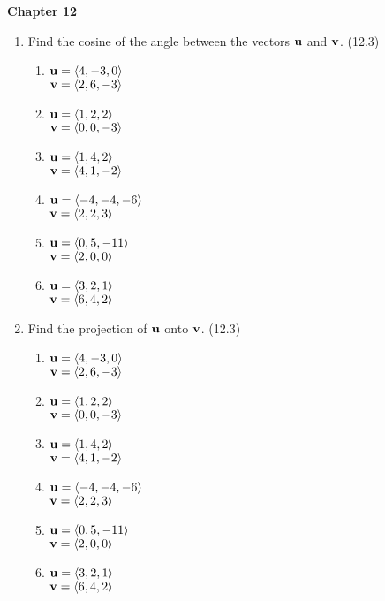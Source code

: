 \newcommand{\thetitle}{
  Stewart's Calculus Chapter 12-16 | Study Problems
}





\centerline{\bf Chapter 12}

  \begin{enumerate}

    \item Find the cosine of the angle between the vectors $\mathbf{u}$ and $\mathbf{v}$. (12.3)

      \begin{enumerate}
        \item $\mathbf{u}=\left<4,-3,0\right>$\\ $\mathbf{v}=\left<2,6,-3\right>$
        \item $\mathbf{u}=\left<1,2,2\right>$\\ $\mathbf{v}=\left<0,0,-3\right>$
        \item $\mathbf{u}=\left<1,4,2\right>$\\ $\mathbf{v}=\left<4,1,-2\right>$
        \item $\mathbf{u}=\left<-4,-4,-6\right>$\\ $\mathbf{v}=\left<2,2,3\right>$
        \item $\mathbf{u}=\left<0,5,-11\right>$\\ $\mathbf{v}=\left<2,0,0\right>$
        \item $\mathbf{u}=\left<3,2,1\right>$\\ $\mathbf{v}=\left<6,4,2\right>$
      \end{enumerate}

    \item Find the projection of $\mathbf{u}$ onto $\mathbf{v}$. (12.3)

      \begin{enumerate}
        \item $\mathbf{u}=\left<4,-3,0\right>$\\ $\mathbf{v}=\left<2,6,-3\right>$
        \item $\mathbf{u}=\left<1,2,2\right>$\\ $\mathbf{v}=\left<0,0,-3\right>$
        \item $\mathbf{u}=\left<1,4,2\right>$\\ $\mathbf{v}=\left<4,1,-2\right>$
        \item $\mathbf{u}=\left<-4,-4,-6\right>$\\ $\mathbf{v}=\left<2,2,3\right>$
        \item $\mathbf{u}=\left<0,5,-11\right>$\\ $\mathbf{v}=\left<2,0,0\right>$
        \item $\mathbf{u}=\left<3,2,1\right>$\\ $\mathbf{v}=\left<6,4,2\right>$
      \end{enumerate}


\end{enumerate}
